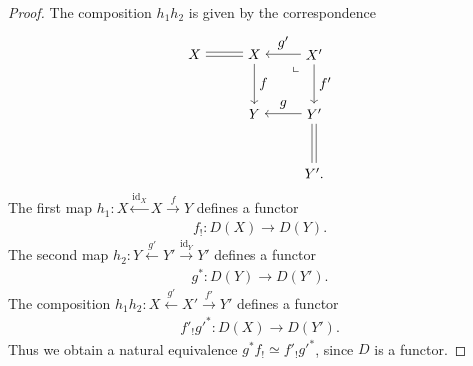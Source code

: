 \documentclass[a4paper,dvipdfmx,11pt,reqno]{amsart}
\DeclareMathOperator{\id}{id}
\theoremstyle{definition}
\begin{document}
\begin{proof}
  The composition $h_1h_2$ is given by the correspondence
  \[\begin{tikzpicture}[auto]
    \node (11) at (0,3) {$X$};
    \node (12) at (1.5,3) {$X$};
    \node (13) at (3,3) {$X'$};
    \node (22) at (1.5,1.5) {$Y$};
    \node (23) at (3,1.5) {$Y'$};
    \node (33) at (3,0) {$Y'.$};
    \draw[transform canvas={yshift=1.5pt}] (12) -- (11);
    \draw[transform canvas={yshift=-1.5pt}] (12) -- (11);   
    \draw[->] (13) -- node[swap] {$g'$} (12);
    \draw[->] (23) -- node[swap] {$g$} (22);
    \draw[->] (12) -- node {$f$} (22);
    \draw[->] (13) -- node {$f'$} (23);
    \draw[transform canvas={xshift=1.5pt}] (23) -- (33);
    \draw[transform canvas={xshift=-1.5pt}] (23) -- (33);
    \node at (2.6,2.6) {\rotatebox[origin=c]{90}{$\ulcorner$}};
  \end{tikzpicture}\]
  The first map $h_1 : X \xleftarrow{\id_X} X \xrightarrow{f} Y$ defines a functor 
  \begin{align*}
    f_! : D(X) \to D(Y).
  \end{align*}
  The second map $h_2 : Y \xleftarrow{g'} Y' \xrightarrow{\id_Y} Y'$ defines a functor 
  \begin{align*}
    g^{*} : D(Y) \to D(Y').
  \end{align*}
  The composition $h_1h_2 : X \xleftarrow{g'} X' \xrightarrow{f'} Y'$ defines a functor
  \begin{align*}
    f'_{!}g'^{*} : D(X) \to D(Y').
  \end{align*}
  Thus we obtain a natural equivalence $g^{*}f_{!} \simeq f'_{!}g'^{*}$, since $D$ is a functor.


\end{proof}
\end{document}
